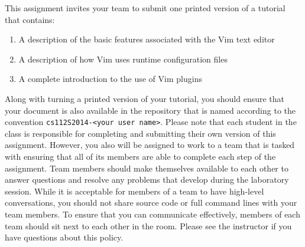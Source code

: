 This assignment invites your team to submit one printed version of a tutorial that contains:

\begin{enumerate}
	
	\item A description of the basic features associated with the Vim text editor

	\item A description of how Vim uses runtime configuration files

	\item A complete introduction to the use of Vim plugins 

\end{enumerate}

Along with turning a printed version of your tutorial, you should ensure that your document is also available in the repository
that is named according to the convention {\tt cs112S2014-<your user name>}. Please note that each student in the class is
responsible for completing and submitting their own version of this assignment.  However, you also will be assigned to work to a
team that is tasked with ensuring that all of its members are able to complete each step of the assignment.  Team members should
make themselves available to each other to answer questions and resolve any problems that develop during the laboratory session.
While it is acceptable for members of a team to have high-level conversations, you should not share source code or full command
lines with your team members. To ensure that you can communicate effectively, members of each team should sit next to each other
in the room.  Please see the instructor if you have questions about this policy.


